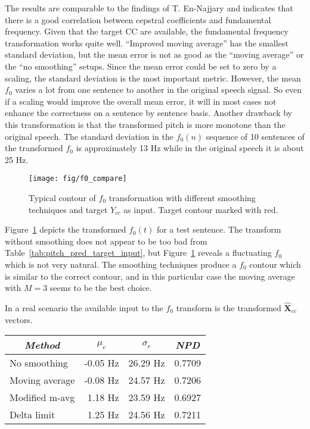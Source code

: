 The results are comparable to the findings of T. En-Najjary \etal \cite{najjary03new} and indicates that there is a good correlation between cepstral coefficients and fundamental frequency. Given that the target CC are available, the fundamental frequency transformation works quite well. ``Improved moving average'' has the smallest standard deviation, but the mean error is not as good as the ``moving average'' or the ``no smoothing'' setups. Since the mean error could be set to zero by a scaling, the standard deviation is the most important metric. However, the mean $f_0$ varies a lot from one sentence to another in the original speech signal. So even if a scaling would improve the overall mean error, it will in most cases not enhance the correctness on a sentence by sentence basis. Another drawback by this transformation is that the transformed pitch is more monotone than the original speech. The standard deviation in the $f_0(n)$ sequence of 10 sentences of the transformed $f_0$ is approximately 13 Hz while in the original speech it is about 25 Hz.

\begin{figure}[htbp]
	\begin{center}
		\texttt{[image: fig/f0\_compare]}
		\caption{Typical contour of $f_0$ transformation with different smoothing techniques and target $Y_{cc}$ as input. Target contour marked with red.}
		\label{fig:pitch_trans}
	\end{center}
\end{figure}
Figure~\ref{fig:pitch_trans} depicts the transformed $f_0(t)$ for a test sentence. The transform without smoothing does not appear to be too bad from Table~\ref{tab:pitch_pred_target_input}, but Figure~\ref{fig:pitch_trans} reveals a fluctuating $f_0$ which is not very natural. The smoothing techniques produce a $f_0$ contour which is similar to the correct contour, and in this particular case the moving average with $M=3$ seems to be the best choice.

In a real scenario the available input to the $f_0$ transform is the transformed $\mathbf{\hat{X}}_{cc}$ vectors. 
\begin{table}[htbp]
	\begin{center}
		\label{tab:pitch_pred_transformed_input}	
		\begin{tabular}{lrrr}
			\toprule
			\multicolumn{1}{c}{\emph{Method}} & \multicolumn{1}{c}{$\mu_e$} & \multicolumn{1}{c}{$\sigma_e$} & \multicolumn{1}{c}{\emph{NPD}} \\
			\midrule
			No smoothing & -0.05 Hz  & 26.29 Hz & 0.7709\\
			Moving average & -0.08 Hz  & 24.57 Hz & 0.7206\\
			Modified m-avg & 1.18 Hz & 23.59 Hz & 0.6927\\
			Delta limit & 1.25 Hz & 24.56 Hz & 0.7211 \\
			\bottomrule			
		\end{tabular}		
	\end{center}
\end{table}

